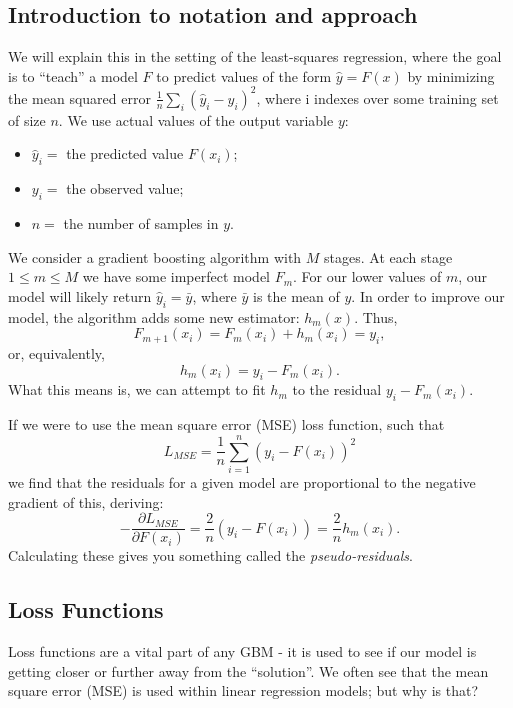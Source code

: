 \documentclass{article}
\begin{document}
\subsection{Introduction to notation and approach}
We will explain this in the setting of the least-squares regression, where the goal is to ``teach'' a model $F$ to predict values of the form $\hat{y}=F(x)$ by minimizing the mean squared error $\frac{1}{n}\sum_i (\hat{y}_i - y_i)^2$, where i indexes over some training set of size $n$. We use actual values of the output variable $y$:
\begin{itemize}
    \item $\hat{y}_i =$ the predicted value $F(x_i)$;
    \item $y_i =$ the observed value;
    \item $n =$ the number of samples in $y$.
\end{itemize}
We consider a gradient boosting algorithm with $M$ stages. At each stage $1\leq m\leq M$ we have some imperfect model $F_m$. For our lower values of $m$, our model will likely return $\hat{y}_i = \bar{y}$, where $\bar{y}$ is the mean of $y$. In order to improve our model, the algorithm adds some new estimator: $h_m(x)$. Thus, 
\begin{equation}
    F_{m+1}(x_i) = F_m(x_i) + h_m(x_i) = y_i,
\end{equation}
or, equivalently,
\begin{equation}
    h_m(x_i) = y_i - F_m(x_i).
\end{equation}
What this means is, we can attempt to fit $h_m$ to the residual $y_i - F_m(x_i)$.

If we were to use the mean square error (MSE) loss function, such that
\begin{equation}
    L_{MSE} = \frac{1}{n}\sum_{i=1}^n(y_i-F(x_i))^2
\end{equation}
we find that the residuals for a given model are proportional to the negative gradient of this, deriving:
\begin{equation}
    -\frac{\partial L_{MSE}}{\partial F(x_i)} = \frac{2}{n}(y_i-F(x_i)) = \frac{2}{n}h_m(x_i).
\end{equation}
Calculating these gives you something called the \textit{pseudo-residuals}.

\subsection{Loss Functions}
 Loss functions are a vital part of any GBM - it is used to see if our model is getting closer or further away from the ``solution''. We often see that the mean square error (MSE) is used within linear regression models; but why is that?
 
\end{document}
